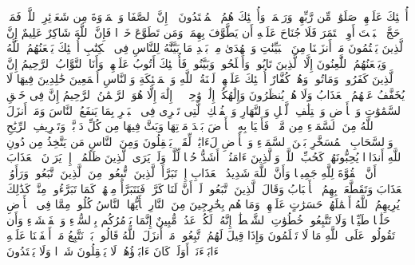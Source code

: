 أُو۟لَٰۤئِكَ عَلَیۡهِمۡ صَلَوَٰتࣱ مِّن رَّبِّهِمۡ وَرَحۡمَةࣱۖ وَأُو۟لَٰۤئِكَ هُمُ ٱلۡمُهۡتَدُونَ%
\stopbuffer
\startbuffer[\q:2:158]
۞ إِنَّ ٱلصَّفَا وَٱلۡمَرۡوَةَ مِن شَعَاۤئِرِ ٱللَّهِۖ فَمَنۡ حَجَّ ٱلۡبَیۡتَ أَوِ ٱعۡتَمَرَ فَلَا جُنَاحَ عَلَیۡهِ أَن یَطَّوَّفَ بِهِمَاۚ وَمَن تَطَوَّعَ خَیۡرࣰا فَإِنَّ ٱللَّهَ شَاكِرٌ عَلِیمٌ%
\stopbuffer
\startbuffer[\q:2:159]
إِنَّ ٱلَّذِینَ یَكۡتُمُونَ مَاۤ أَنزَلۡنَا مِنَ ٱلۡبَیِّنَٰتِ وَٱلۡهُدَىٰ مِنۢ بَعۡدِ مَا بَیَّنَّٰهُ لِلنَّاسِ فِی ٱلۡكِتَٰبِ أُو۟لَٰۤئِكَ یَلۡعَنُهُمُ ٱللَّهُ وَیَلۡعَنُهُمُ ٱللَّٰعِنُونَ%
\stopbuffer
\startbuffer[\q:2:160]
إِلَّا ٱلَّذِینَ تَابُوا۟ وَأَصۡلَحُوا۟ وَبَیَّنُوا۟ فَأُو۟لَٰۤئِكَ أَتُوبُ عَلَیۡهِمۡ وَأَنَا ٱلتَّوَّابُ ٱلرَّحِیمُ%
\stopbuffer
\startbuffer[\q:2:161]
إِنَّ ٱلَّذِینَ كَفَرُوا۟ وَمَاتُوا۟ وَهُمۡ كُفَّارٌ أُو۟لَٰۤئِكَ عَلَیۡهِمۡ لَعۡنَةُ ٱللَّهِ وَٱلۡمَلَٰۤئِكَةِ وَٱلنَّاسِ أَجۡمَعِینَ%
\stopbuffer
\startbuffer[\q:2:162]
خَٰلِدِینَ فِیهَا لَا یُخَفَّفُ عَنۡهُمُ ٱلۡعَذَابُ وَلَا هُمۡ یُنظَرُونَ%
\stopbuffer
\startbuffer[\q:2:163]
وَإِلَٰهُكُمۡ إِلَٰهࣱ وَٰحِدࣱۖ لَّاۤ إِلَٰهَ إِلَّا هُوَ ٱلرَّحۡمَٰنُ ٱلرَّحِیمُ%
\stopbuffer
\startbuffer[\q:2:164]
إِنَّ فِی خَلۡقِ ٱلسَّمَٰوَٰتِ وَٱلۡأَرۡضِ وَٱخۡتِلَٰفِ ٱلَّیۡلِ وَٱلنَّهَارِ وَٱلۡفُلۡكِ ٱلَّتِی تَجۡرِی فِی ٱلۡبَحۡرِ بِمَا یَنفَعُ ٱلنَّاسَ وَمَاۤ أَنزَلَ ٱللَّهُ مِنَ ٱلسَّمَاۤءِ مِن مَّاۤءࣲ فَأَحۡیَا بِهِ ٱلۡأَرۡضَ بَعۡدَ مَوۡتِهَا وَبَثَّ فِیهَا مِن كُلِّ دَاۤبَّةࣲ وَتَصۡرِیفِ ٱلرِّیَٰحِ وَٱلسَّحَابِ ٱلۡمُسَخَّرِ بَیۡنَ ٱلسَّمَاۤءِ وَٱلۡأَرۡضِ لَءَایَٰتࣲ لِّقَوۡمࣲ یَعۡقِلُونَ%
\stopbuffer
\startbuffer[\q:2:165]
وَمِنَ ٱلنَّاسِ مَن یَتَّخِذُ مِن دُونِ ٱللَّهِ أَندَادࣰا یُحِبُّونَهُمۡ كَحُبِّ ٱللَّهِۖ وَٱلَّذِینَ ءَامَنُوۤا۟ أَشَدُّ حُبࣰّا لِّلَّهِۗ وَلَوۡ یَرَى ٱلَّذِینَ ظَلَمُوۤا۟ إِذۡ یَرَوۡنَ ٱلۡعَذَابَ أَنَّ ٱلۡقُوَّةَ لِلَّهِ جَمِیعࣰا وَأَنَّ ٱللَّهَ شَدِیدُ ٱلۡعَذَابِ%
\stopbuffer
\startbuffer[\q:2:166]
إِذۡ تَبَرَّأَ ٱلَّذِینَ ٱتُّبِعُوا۟ مِنَ ٱلَّذِینَ ٱتَّبَعُوا۟ وَرَأَوُا۟ ٱلۡعَذَابَ وَتَقَطَّعَتۡ بِهِمُ ٱلۡأَسۡبَابُ%
\stopbuffer
\startbuffer[\q:2:167]
وَقَالَ ٱلَّذِینَ ٱتَّبَعُوا۟ لَوۡ أَنَّ لَنَا كَرَّةࣰ فَنَتَبَرَّأَ مِنۡهُمۡ كَمَا تَبَرَّءُوا۟ مِنَّاۗ كَذَٰلِكَ یُرِیهِمُ ٱللَّهُ أَعۡمَٰلَهُمۡ حَسَرَٰتٍ عَلَیۡهِمۡۖ وَمَا هُم بِخَٰرِجِینَ مِنَ ٱلنَّارِ%
\stopbuffer
\startbuffer[\q:2:168]
یَٰۤأَیُّهَا ٱلنَّاسُ كُلُوا۟ مِمَّا فِی ٱلۡأَرۡضِ حَلَٰلࣰا طَیِّبࣰا وَلَا تَتَّبِعُوا۟ خُطُوَٰتِ ٱلشَّیۡطَٰنِۚ إِنَّهُۥ لَكُمۡ عَدُوࣱّ مُّبِینٌ%
\stopbuffer
\startbuffer[\q:2:169]
إِنَّمَا یَأۡمُرُكُم بِٱلسُّوۤءِ وَٱلۡفَحۡشَاۤءِ وَأَن تَقُولُوا۟ عَلَى ٱللَّهِ مَا لَا تَعۡلَمُونَ%
\stopbuffer
\startbuffer[\q:2:170]
وَإِذَا قِیلَ لَهُمُ ٱتَّبِعُوا۟ مَاۤ أَنزَلَ ٱللَّهُ قَالُوا۟ بَلۡ نَتَّبِعُ مَاۤ أَلۡفَیۡنَا عَلَیۡهِ ءَابَاۤءَنَاۤۚ أَوَلَوۡ كَانَ ءَابَاۤؤُهُمۡ لَا یَعۡقِلُونَ شَیۡءࣰا وَلَا یَهۡتَدُونَ%

